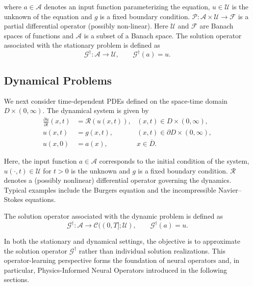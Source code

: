 \documentclass[final,1p,times]{elsarticle}
\theoremstyle{definition}
\newcommand{\G}{\mathcal{G}}
\renewcommand{\P}{\mathcal{P}}
\newcommand{\A}{\mathcal{A}}
\newcommand{\U}{\mathcal{U}}
\newcommand{\F}{\mathcal{F}}
\begin{document}
where $a \in \A$ denotes an input function parameterizing the equation, $u \in \U$ is the unknown of the equation and $g$ is a fixed boundary condition. $\P:\A\times\U\to\F$ is a partial differential operator (possibly non-linear). Here $\U$ and $\F$ are Banach spaces of functions and $\A$ is a subset of a Banach space.
The solution operator associated with the stationary problem is defined as
\begin{equation}\label{eq:stationary_operator}
\G^\dagger : \A \to \U, 
\qquad
\G^\dagger(a) = u.
\end{equation}

\subsection{Dynamical Problems}

We next consider time-dependent PDEs defined on the space-time domain $D \times (0,\infty)$. The dynamical system is given by
\begin{equation}\label{eq:dynamic_pde}
\begin{aligned}
\frac{\partial u}{\partial t}(x,t) &= \mathcal{R}(u(x,t)), 
 &(x,t) \in D \times (0,\infty),\\
u(x,t) &= g(x,t),  &(x,t) \in \partial D \times (0,\infty),\\
u(x,0) &= a(x),  &x \in \overline{D}.
\end{aligned}
\end{equation}

Here, the input function $a \in \mathcal{A}$ corresponds to the initial condition of the system, $u(\cdot,t)\in\U$ for $t>0$ is the unknown and $g$ is a fixed boundary condition. $\mathcal{R}$ denotes a (possibly nonlinear) differential operator governing the dynamics. Typical examples include the Burgers equation and the incompressible Navier--Stokes equations.

The solution operator associated with the dynamic problem is defined as
\begin{equation}\label{eq:dynamic_operator}
\G^\dagger : \A \to \mathcal{C}((0,T];\U), 
\qquad
\G^\dagger(a) = u.
\end{equation}

In both the stationary and dynamical settings, the objective is to approximate the solution operator $\G^\dagger$ rather than individual solution realizations. This operator-learning perspective forms the foundation of neural operators and, in particular, Physics-Informed Neural Operators introduced in the following sections.
\end{document}
